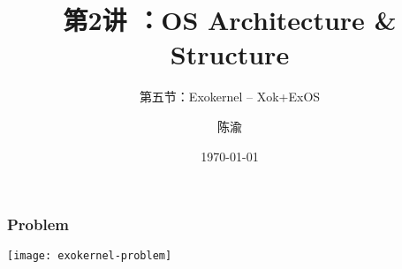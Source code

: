 


\title[第1讲]{第2讲 ：OS Architecture \& Structure} %
\subtitle{第五节：Exokernel -- Xok+ExOS }
\author{陈渝} %
\date{\today} %




\begin{frame}
\titlepage %
\end{frame}

%
%


\begin{frame}[plain]
	\frametitle{Problem}
	
	\centering
	\texttt{[image: exokernel-problem]}
	
\end{frame}


